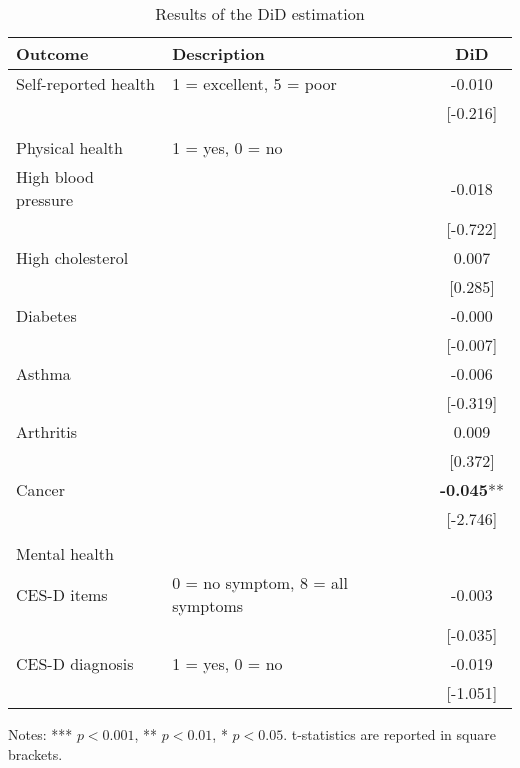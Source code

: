 \documentclass[11pt]{article}
\begin{document}
    \begin{table}[h!]
        \centering
        \caption{Results of the DiD estimation}
        \label{tab:did}
        \begin{threeparttable}
            \begin{tabular}{llc}
                \toprule
                Outcome & Description & DiD \\
                \midrule
                Self-reported health & 1 = excellent, 5 = poor & -0.010 \\
                &  & [-0.216] \\
                & & \\
                Physical health & 1 = yes, 0 = no & \\
                High blood pressure &  & -0.018 \\
                &  & [-0.722] \\
                High cholesterol &  & 0.007 \\
                &  & [0.285] \\
                Diabetes &  & -0.000 \\
                &  & [-0.007] \\
                Asthma &  & -0.006 \\
                &  & [-0.319] \\
                Arthritis &  & 0.009 \\
                &  & [0.372] \\
                Cancer &  & \textbf{-0.045}** \\
                &  & [-2.746] \\
                & & \\
                Mental health & & \\
                CES-D items & 0 = no symptom, 8 = all symptoms & -0.003 \\
                &  & [-0.035] \\
                CES-D diagnosis & 1 = yes, 0 = no & -0.019 \\
                &  & [-1.051] \\
                \bottomrule
            \end{tabular}
            \begin{tablenotes}
                \footnotesize
                \item Notes: *** $p < 0.001$, ** $p < 0.01$, * $p < 0.05$. t-statistics are reported in square brackets.
            \end{tablenotes}
        \end{threeparttable}
    \end{table}
\end{document}
